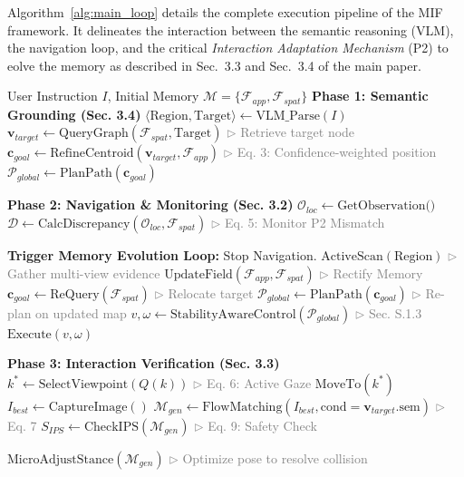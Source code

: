 \documentclass[conference]{IEEEtran}
\newcommand{\COMMENT}[1]{\hfill \textcolor{gray}{$\triangleright$ #1}}
\begin{document}
Algorithm~\ref{alg:main_loop} details the complete execution pipeline of the MIF framework. It delineates the interaction between the semantic reasoning (VLM), the navigation loop, and the critical \textit{Interaction Adaptation Mechanism} (P2) to eolve the memory as described in Sec.~3.3 and Sec.~3.4 of the main paper.

\begin{algorithm}[h]
\caption{Multi-modal Interactive Field (MIF) Execution Loop}
\label{alg:main_loop}
\begin{algorithmic}[1]
\REQUIRE User Instruction $I$, Initial Memory $\mathcal{M} = \{\mathcal{F}_{app}, \mathcal{F}_{spat}\}$
\STATE \textbf{Phase 1: Semantic Grounding (Sec. 3.4)}
\STATE $\langle \text{Region}, \text{Target} \rangle \leftarrow \text{VLM\_Parse}(I)$
\STATE $\mathbf{v}_{target} \leftarrow \text{QueryGraph}(\mathcal{F}_{spat}, \text{Target})$ \COMMENT{Retrieve target node}
\STATE $\mathbf{c}_{goal} \leftarrow \text{RefineCentroid}(\mathbf{v}_{target}, \mathcal{F}_{app})$ \COMMENT{Eq. 3: Confidence-weighted position}
\STATE $\mathcal{P}_{global} \leftarrow \text{PlanPath}(\mathbf{c}_{goal})$

\STATE \textbf{Phase 2: Navigation \& Monitoring (Sec. 3.2)}
    \STATE $\mathcal{O}_{loc} \leftarrow \text{GetObservation()}$
    \STATE $\mathcal{D} \leftarrow \text{CalcDiscrepancy}(\mathcal{O}_{loc}, \mathcal{F}_{spat})$ \COMMENT{Eq. 5: Monitor P2 Mismatch}
    
        \STATE \textbf{Trigger Memory Evolution Loop:}
        \STATE Stop Navigation.
        \STATE $\text{ActiveScan}(\text{Region})$ \COMMENT{Gather multi-view evidence}
        \STATE $\text{UpdateField}(\mathcal{F}_{app}, \mathcal{F}_{spat})$ \COMMENT{Rectify Memory}
        \STATE $\mathbf{c}_{goal} \leftarrow \text{ReQuery}(\mathcal{F}_{spat})$ \COMMENT{Relocate target}
        \STATE $\mathcal{P}_{global} \leftarrow \text{PlanPath}(\mathbf{c}_{goal})$ \COMMENT{Re-plan on updated map}
    \ELSE
        \STATE $v, \omega \leftarrow \text{StabilityAwareControl}(\mathcal{P}_{global})$ \COMMENT{Sec. S.1.3}
        \STATE $\text{Execute}(v, \omega)$
    \ENDIF
\ENDWHILE

\STATE \textbf{Phase 3: Interaction Verification (Sec. 3.3)}
    \STATE $k^* \leftarrow \text{SelectViewpoint}(Q(k))$ \COMMENT{Eq. 6: Active Gaze}
    \STATE $\text{MoveTo}(k^*)$
    \STATE $I_{best} \leftarrow \text{CaptureImage}()$
    \STATE $\mathcal{M}_{gen} \leftarrow \text{FlowMatching}(I_{best}, \text{cond}=\mathbf{v}_{target}.\text{sem})$ \COMMENT{Eq. 7}
    \STATE $S_{IPS} \leftarrow \text{CheckIPS}(\mathcal{M}_{gen})$ \COMMENT{Eq. 9: Safety Check}
    
        \STATE $\text{MicroAdjustStance}(\mathcal{M}_{gen})$ \COMMENT{Optimize pose to resolve collision}
    \ENDIF
\ENDWHILE

\RETURN {}
\end{algorithmic}
\end{algorithm}
\end{document}
